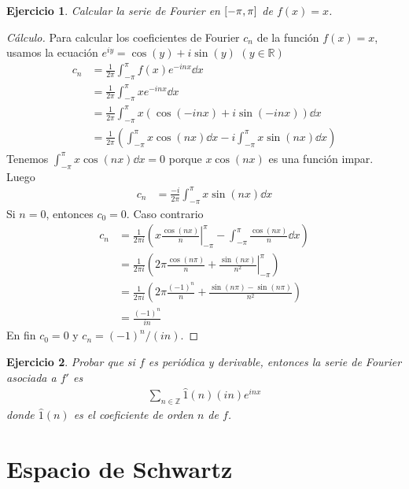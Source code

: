 \documentclass{article}
\newcommand{\integerNumbers}{\mathbb{Z}}
\newcommand{\realNumbers}{\mathbb{R}}
\newcommand{\fourier}[1]{\hat{1}}
\newtheorem{exercise}{Ejercicio}
\newcommand{\leftOpenInterval}{\left]}
\newcommand{\rightOpenInterval}{\right[}
\newcommand{\leftClosedInterval}{\left[}
\newcommand{\rightClosedInterval}{\right]}
\newcommand{\interval}[3]{%
  \ifstrequal{#1}{oo}{%
    \leftOpenInterval #2, #3 \rightOpenInterval%
  }{%
    \ifstrequal{#1}{co}{%
      \leftClosedInterval #2, #3 \rightOpenInterval%
    }{%
      \ifstrequal{#1}{oc}{
        \leftOpenInterval #2, #3 \rightClosedInterval%
      }{%
        \ifstrequal{#1}{cc}{
          \leftClosedInterval #2, #3 \rightClosedInterval
        }{%
        }%
      }%
    }%
  }%
}
\theoremstyle{remark}
\begin{document}
\begin{exercise}
  Calcular la serie de Fourier en \(\interval{cc}{- \pi}{\pi}\) de \(f(x) = x\).
\end{exercise}
\begin{proof}[Cálculo]
  Para calcular los coeficientes de Fourier \(c_n\) de la función \(f(x) = x\), usamos la ecuación \(e^{i y} = \cos(y) + i \sin(y)\) \((y \in \realNumbers)\)
  \begin{align}
    c_n
    &=
    \frac{1}{2 \pi} \int_{- \pi}^{\pi} f(x) e^{- i n x} \dd x
    \\
    &=
    \frac{1}{2 \pi} \int_{- \pi}^{\pi} x e^{- i n x} \dd x
    \\
    &=
    \frac{1}{2 \pi} \int_{- \pi}^{\pi} x (\cos(- i n x) + i \sin(- i n x)) \dd x
    \\
    &=
    \frac{1}{2 \pi}
    \left(
      \int_{- \pi}^{\pi} x \cos(n x) \dd x
      -
      i \int_{- \pi}^{\pi} x \sin(n x) \dd x
    \right)
  \end{align}
  Tenemos \(\int_{- \pi}^{\pi} x \cos(n x) \dd x = 0\) porque \(x \cos(n x)\) es una función impar.
  Luego
  \begin{align}
    c_n
    &=
    \frac{- i}{2 \pi}
    \int_{- \pi}^{\pi} x \sin(n x) \dd x
  \end{align}
  Si \(n = 0\), entonces \(c_0 = 0\).
  Caso contrario
  \begin{align}
    c_n
    &=
    \frac{1}{2 \pi i}
    \left(
      \left. x \frac{\cos(n x)}{n} \right|_{- \pi}^{\pi}
      -
      \int_{- \pi}^{\pi} \frac{\cos(n x)}{n} \dd x
    \right)
    \\
    &=
    \frac{1}{2 \pi i}
    \left(
      2 \pi \frac{\cos(n \pi)}{n}
      +
      \left. \frac{\sin(n x)}{n^2} \right|_{- \pi}^{\pi}
    \right)
    \\
    &=
    \frac{1}{2 \pi i}
    \left(
      2 \pi \frac{(- 1)^n}{n}
      +
      \frac{\sin(n \pi) - \sin(n \pi)}{n^2}
    \right)
    \\
    &=
    \frac{(- 1)^n}{i n}
  \end{align}
  En fin \(c_0 = 0\) y \(c_n = (- 1)^n / (i n)\).
\end{proof}

\begin{exercise}
  Probar que si \(f\) es periódica y derivable, entonces la serie de Fourier asociada a \(f'\) es
  \begin{align}
    \sum_{n \in \integerNumbers} \fourier{f} (n) (i n) e^{i n x}
  \end{align}
  donde \(\fourier{f}(n)\) es el coeficiente de orden \(n\) de \(f\).
\end{exercise}

\section{Espacio de Schwartz}
\end{document}
